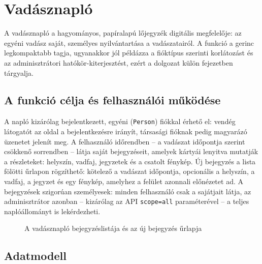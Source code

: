 
\chapter{Vadásznapló}
\label{chap:naplo}

A vadásznapló a hagyományos, papíralapú lőjegyzék digitális megfelelője: az egyéni vadász saját,
személyes nyilvántartása a vadászatairól. A funkció a gerinc legkompaktabb tagja, ugyanakkor jól
példázza a fióktípus szerinti korlátozást és az adminisztrátori hatókör-kiterjesztést, ezért a
dolgozat külön fejezetben tárgyalja.

\section{A funkció célja és felhasználói működése}
\label{sec:log-cel}

A napló kizárólag bejelentkezett, egyéni (\texttt{Person}) fiókkal érhető el: vendég látogatót az
oldal a bejelentkezésre irányít, társasági fióknak pedig magyarázó üzenetet jelenít meg. A
felhasználó időrendben -- a vadászat időpontja szerint csökkenő sorrendben -- látja saját
bejegyzéseit, amelyek kártyái lenyitva mutatják a részleteket: helyszín, vadfaj, jegyzetek és a
csatolt fénykép. Új bejegyzés a lista fölötti űrlapon rögzíthető: kötelező a vadászat időpontja,
opcionális a helyszín, a vadfaj, a jegyzet és egy fénykép, amelyhez a felület azonnali előnézetet
ad. A bejegyzések szigorúan személyesek: minden felhasználó csak a sajátjait látja, az
adminisztrátor azonban -- kizárólag az API \texttt{scope=all} paraméterével -- a teljes
naplóállományt is lekérdezheti.

\begin{figure}[htbp]
	\centering
	\caption{A vadásznapló bejegyzéslistája és az új bejegyzés űrlapja}
	\label{fig:hunting-logs-screen}
\end{figure}

\section{Adatmodell}
\label{sec:log-adatmodell}

